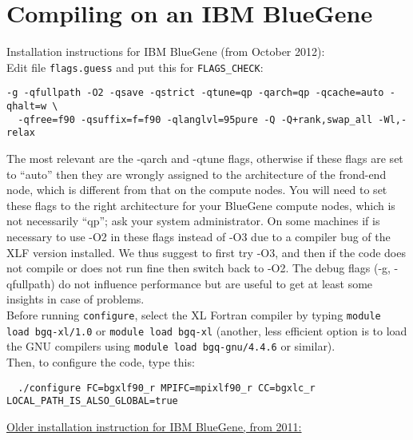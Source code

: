 \section{Compiling on an IBM BlueGene}

\noindent
Installation instructions for IBM BlueGene (from October 2012):\\

\noindent
Edit file \texttt{flags.guess} and put this for \texttt{FLAGS\_CHECK}:
{\small
\begin{verbatim}
-g -qfullpath -O2 -qsave -qstrict -qtune=qp -qarch=qp -qcache=auto -qhalt=w \
  -qfree=f90 -qsuffix=f=f90 -qlanglvl=95pure -Q -Q+rank,swap_all -Wl,-relax
\end{verbatim}
}

\noindent
The most relevant are the -qarch and -qtune flags, otherwise if these flags are set to ``auto'' then they are wrongly assigned to
the architecture of the frond-end node, which is different from that on the compute nodes.
You will need to set these flags to the right architecture for your BlueGene compute nodes, which is not necessarily ``qp'';
ask your system administrator.
On some machines if is necessary to use -O2 in these flags instead of -O3 due to a compiler bug of the XLF version installed.
We thus suggest to first try -O3, and then if the code does not compile or does not run fine then switch back to -O2.
The debug flags (-g, -qfullpath) do not influence performance but are useful to get at least some insights in case of problems.\\

\noindent
Before running \texttt{configure}, select the XL Fortran compiler by typing \texttt{module load bgq-xl/1.0}
or \texttt{module load bgq-xl} (another, less efficient option is to load the GNU compilers using \texttt{module load bgq-gnu/4.4.6} or similar).\\

\noindent
Then, to configure the code, type this:
{\small
\begin{verbatim}
  ./configure FC=bgxlf90_r MPIFC=mpixlf90_r CC=bgxlc_r LOCAL_PATH_IS_ALSO_GLOBAL=true
\end{verbatim}
}

\noindent
\underline{Older installation instruction for IBM BlueGene, from 2011:}\\

